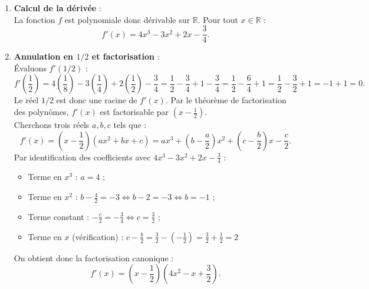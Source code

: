 \documentclass[11pt,a4paper]{article}
\newcommand{\R}{\mathbb{R}}
\begin{document}
\begin{correctionbox}
\begin{enumerate}[label=\textbf{\arabic*.}]
    \item \textbf{Calcul de la dérivée} :\\
    La fonction $f$ est polynomiale donc dérivable sur $\R$. Pour tout $x \in \R$ :
    \[
    f'(x) = 4x^3 - 3x^2 + 2x - \frac{3}{4}.
    \]

    \item \textbf{Annulation en $1/2$ et factorisation} :\\
    Évaluons $f'(1/2)$ :
    \[
    f'\left(\frac{1}{2}\right) = 4\left(\frac{1}{8}\right) - 3\left(\frac{1}{4}\right) + 2\left(\frac{1}{2}\right) - \frac{3}{4} = \frac{1}{2} - \frac{3}{4} + 1 - \frac{3}{4} = \frac{1}{2} - \frac{6}{4} + 1 = \frac{1}{2} - \frac{3}{2} + 1 = -1 + 1 = 0.
    \]
    Le réel $1/2$ est donc une racine de $f'(x)$. Par le théorème de factorisation des polynômes, $f'(x)$ est factorisable par $\left(x - \frac{1}{2}\right)$.\\
    Cherchons trois réels $a, b, c$ tels que :
    \[
    f'(x) = \left(x - \frac{1}{2}\right)(ax^2 + bx + c) = ax^3 + \left(b - \frac{a}{2}\right)x^2 + \left(c - \frac{b}{2}\right)x - \frac{c}{2}.
    \]
    Par identification des coefficients avec $4x^3 - 3x^2 + 2x - \frac{3}{4}$ :
    \begin{itemize}
        \item Terme en $x^3$ : $a = 4$ ;
        \item Terme en $x^2$ : $b - \frac{4}{2} = -3 \iff b - 2 = -3 \iff b = -1$ ;
        \item Terme constant : $-\frac{c}{2} = -\frac{3}{4} \iff c = \frac{3}{2}$ ;
        \item Terme en $x$ (vérification) : $c - \frac{b}{2} = \frac{3}{2} - \left(-\frac{1}{2}\right) = \frac{3}{2} + \frac{1}{2} = 2$ \quad \checkmark
    \end{itemize}
    On obtient donc la factorisation canonique :
    \[
    f'(x) = \left(x - \frac{1}{2}\right)\left(4x^2 - x + \frac{3}{2}\right).
    \]


\end{enumerate}
\end{correctionbox}
\end{document}
